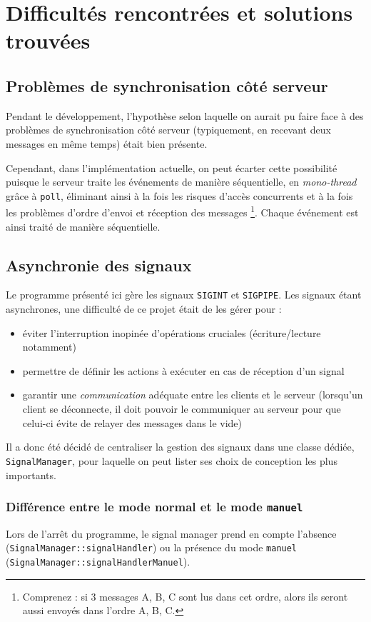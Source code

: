 \documentclass{article}
\begin{document}
\section{Difficultés rencontrées et solutions trouvées}
\subsection{Problèmes de synchronisation côté serveur}
Pendant le développement, l'hypothèse selon laquelle on aurait pu faire face à des problèmes de synchronisation côté serveur (typiquement, en recevant deux messages en même temps) était bien présente. 

Cependant, dans l'implémentation actuelle, on peut écarter cette possibilité puisque le serveur traite les événements de manière séquentielle, en \textit{mono-thread} grâce à \texttt{poll}, éliminant ainsi à la fois les risques d'accès concurrents et à la fois les problèmes d'ordre d'envoi et réception des messages \footnote{Comprenez : si 3 messages A, B, C sont lus dans cet ordre, alors ils seront aussi envoyés dans l'ordre A, B, C.}. Chaque événement est ainsi traité de manière séquentielle.

\subsection{Asynchronie des signaux}
Le programme présenté ici gère les signaux \texttt{SIGINT} et \texttt{SIGPIPE}. Les signaux étant asynchrones, une difficulté de ce projet était de les gérer pour :
\begin{itemize}
    \item éviter l'interruption inopinée d'opérations cruciales (écriture/lecture notamment)
    \item permettre de définir les actions à exécuter en cas de réception d'un signal
    \item garantir une \textit{communication} adéquate entre les clients et le serveur (lorsqu'un client se déconnecte, il doit pouvoir le communiquer au serveur pour que celui-ci évite de relayer des messages dans le vide)
\end{itemize}

Il a donc été décidé de centraliser la gestion des signaux dans une classe dédiée, \texttt{SignalManager}, pour laquelle on peut lister ses choix de conception les plus importants.
\subsubsection{Différence entre le mode normal et le mode \texttt{manuel}}
Lors de l'arrêt du programme, le signal manager prend en compte l'absence (\texttt{SignalManager::signalHandler}) ou la présence du mode \texttt{manuel} (\texttt{SignalManager::signalHandlerManuel}).
\end{document}
